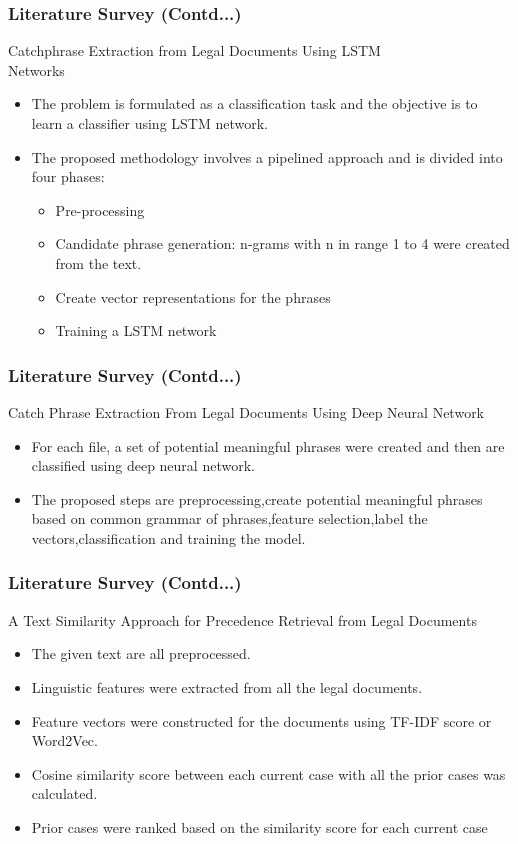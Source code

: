 \documentclass{beamer}
\begin{document}
\begin{frame}\frametitle{Literature Survey (Contd...)}
    Catchphrase Extraction from Legal Documents Using LSTM \\Networks\cite{bhargava2017catchphrase}
  
    \begin{itemize}
    	\item The problem is formulated as a classification task and the objective is to learn a classifier using LSTM network.
\item The proposed methodology involves a pipelined approach and is divided into four phases: 
\begin{itemize}
	\item Pre-processing
	\item Candidate phrase generation: n-grams with n in range 1 to 4 were created from the text.
	\item Create vector representations for the phrases
	\item Training a LSTM network 
\end{itemize}
 
    \end{itemize}
\end{frame}


\begin{frame}\frametitle{Literature Survey (Contd...)}
    Catch Phrase Extraction From Legal Documents Using Deep Neural Network\cite{das2017catch}
    \begin{itemize}
\item For each file, a set of potential meaningful phrases were created and then are classified using deep neural network.
\item The proposed steps are preprocessing,create potential meaningful phrases based on common grammar of phrases,feature selection,label the vectors,classification and training the model.
    \end{itemize}
\end{frame}

\begin{frame}\frametitle{Literature Survey (Contd...)}
   A Text Similarity Approach for Precedence Retrieval from Legal Documents\cite{thenmozhi2017text}
  
    \begin{itemize}
\item The given text are all preprocessed.  
\item Linguistic features were extracted from all the legal documents.
\item Feature vectors were constructed for the documents using TF-IDF score or Word2Vec.
\item Cosine similarity score between each current case with all the prior cases was calculated.
\item Prior cases were ranked based on the similarity score for each current case
    \end{itemize}
\end{frame}
\end{document}
